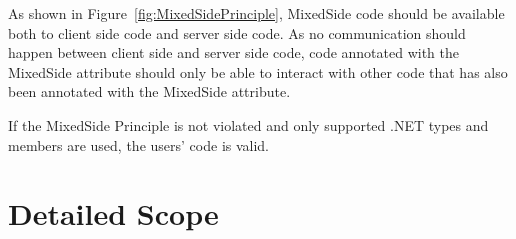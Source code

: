 		As shown in Figure~\ref{fig:MixedSidePrinciple}, MixedSide code should be available both to client side code and server side code. As no communication should happen between client side and server side code, code annotated with the MixedSide attribute should only be able to interact with other code that has also been annotated with the MixedSide attribute. 

		If the MixedSide Principle is not violated and only supported .NET types and members are used, the users’ code is valid.







\section{Detailed Scope}